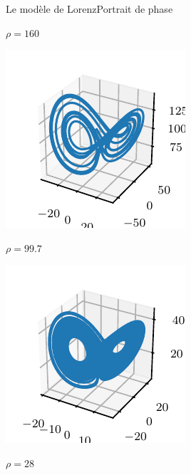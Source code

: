 \documentclass[usenames,dvipsnames,svgnames,10pt,aspectratio=169]{beamer}
\begin{document}
\begin{frame}[t, c]{Le modèle de Lorenz}{Portrait de phase}
\begin{minipage}{.225\textwidth}
		$\rho = 160$
	\end{minipage}%
	\hfill
	\begin{minipage}{.225\textwidth}
		\centering
		\includegraphics[width=.95\textwidth]{lorenz_phase_plot_2}

		$\rho = 99.7$
	\end{minipage}%
	\hfill
	\begin{minipage}{.225\textwidth}
		\centering
		\includegraphics[width=.95\textwidth]{lorenz_phase_plot_3}

		$\rho = 28$
	\end{minipage}

	\vspace{1cm}
\end{frame}
\end{document}
